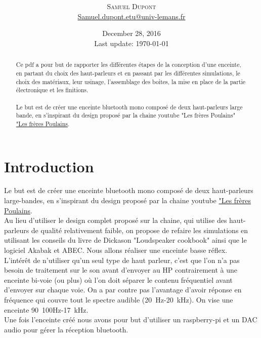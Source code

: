 \documentclass[a4paper,english]{report}
\title{				\fbox{\parbox{0.8\textwidth }{\centering Réalisation d'une enceinte\\ 2}}\\ } %
\author{%
			\textsc{Samuel Dupont}\\ %
			\normalsize \href{mailto:Samuel.dupont.etu@univ-lemans.fr}{Samuel.dupont.etu@univ-lemans.fr } 
		}
\date{December 28, 2016 \\ Last update: \today}
\makeatletter
\newcommand{\frontmatter}{\let\ps@plain\ps@empty\pagestyle{empty}}
\makeatother
\begin{document}
			\maketitle
			\frontmatter %

				\begin{abstract}
					\noindent 
					
				Ce pdf a pour but de rapporter les différentes étapes de la conception d'une enceinte, en partant du choix des haut-parleurs et en passant par les différentes simulations, le choix des matériaux, leur usinage, l'assemblage des boites, la mise en place de  la partie électronique et les finitions.\\ \\
				Le but est de créer une enceinte bluetooth  mono composé de deux haut-parleurs large bande, en s'inspirant du design proposé par la chaine youtube "Les frères Poulains" \href{https://www.youtube.com/watch?v=ollr-PpCMAw}{"Les frères Poulains}. \\

				\end{abstract}
			

			
			\chapter{Introduction}
			Le but est de créer une enceinte bluetooth  mono composé de deux haut-parleurs large-bandes, en s'inspirant du design proposé par la chaine youtube \href{https://www.youtube.com/watch?v=ollr-PpCMAw}{"Les frères Poulains}. \\
			Au lieu d'utiliser le design complet proposé sur la chaine, qui utilise des haut-parleurs de qualité relativement faible, on propose de refaire les simulations en utilisant les conseils du livre de Dickason "Loudspeaker cookbook" ainsi que le logiciel Akabak et ABEC. Nous allons réaliser une enceinte basse réflex.\\
			L'intérêt de n'utiliser qu'un seul type de haut parleur, c'est que l'on n'a pas besoin de traitement sur le son avant d'envoyer au HP contrairement à une enceinte bi-voie (ou plus) où l'on doit séparer le contenu fréquentiel avant d'envoyer sur chaque voie. On a par contre pas l'avantage d'avoir réponse en fréquence qui couvre tout le spectre audible (20~Hz-20~kHz). On vise une enceinte 90~100Hz-17~kHz.\\
			Une fois l'enceinte créé nous avons pour but d'utiliser un raspberry-pi et un DAC audio pour gérer la réception bluetooth. 		
			
\end{document}
